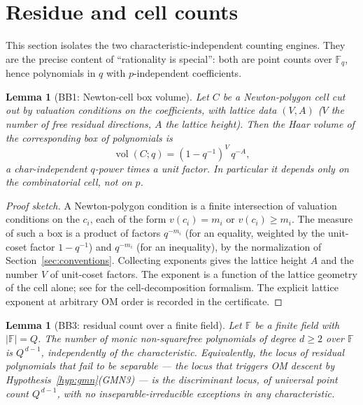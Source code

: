 \documentclass[pdflatex,sn-mathphys-num]{sn-jnl}%
\DeclareMathOperator{\vol}{vol}
\newcommand{\bbF}{\mathbb{F}}
\theoremstyle{plain}
\newtheorem{lemma}[theorem]{Lemma}
\theoremstyle{definition}
\theoremstyle{remark}
\numberwithin{equation}{section}
\begin{document}
\section{Residue and cell counts}\label{sec:counts}

This section isolates the two characteristic-independent counting engines. They
are the precise content of ``rationality is special'': both are point counts over
$\bbF_{q}$, hence polynomials in $q$ with $p$-independent coefficients.

\begin{lemma}[\textsc{BB1}: Newton-cell box volume]\label{lem:bb1}
Let $C$ be a Newton-polygon cell cut out by valuation conditions on the
coefficients, with lattice data $(V,A)$ ($V$ the number of free residual
directions, $A$ the lattice height). Then the Haar volume of the corresponding
box of polynomials is
\[
  \vol(C;q)=(1-q^{-1})^{V}\,q^{-A},
\]
a char-independent $q$-power times a unit factor. In particular it depends only on
the combinatorial cell, not on $p$.
\end{lemma}

\begin{proof}[Proof sketch]
A Newton-polygon condition is a finite intersection of valuation conditions on the
$c_{i}$, each of the form $v(c_{i})=m_{i}$ or $v(c_{i})\ge m_{i}$. The measure of
such a box is a product of factors $q^{-m_{i}}$ (for an equality, weighted by the
unit-coset factor $1-q^{-1}$) and $q^{-m_{i}}$ (for an inequality), by the
normalization of Section~\ref{sec:conventions}. Collecting exponents gives the
lattice height $A$ and the number $V$ of unit-coset factors. The exponent is a
function of the lattice geometry of the cell alone; see \cite{denef1991functional}
for the cell-decomposition formalism. The explicit lattice exponent at arbitrary
OM order is recorded in the certificate.
\end{proof}

\begin{lemma}[\textsc{BB3}: residual count over a finite field]\label{lem:bb3}
Let $\bbF$ be a finite field with $|\bbF|=Q$. The number of monic non-squarefree
polynomials of degree $d\ge2$ over $\bbF$ is $Q^{\,d-1}$, independently of the
characteristic. Equivalently, the locus of residual polynomials that fail to be
separable --- the locus that triggers OM descent by Hypothesis~\textup{\ref{hyp:gmn}}(GMN3)
--- is the discriminant locus, of universal point count $Q^{\,d-1}$, with no
inseparable-irreducible exceptions in any characteristic.
\end{lemma}
\end{document}
